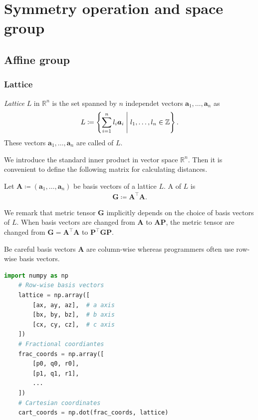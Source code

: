 \section{\label{sec:operation}Symmetry operation and space group}

\subsection{Affine group}

\subsubsection{Lattice}

\begin{screen}
  \begin{defn}[lattice]
    \textit{Lattice} $L$ in $\mathbb{R}^{n}$ is the set spanned by $n$ independet vectors $\bm{a}_{1}, \dots, \bm{a}_{n}$ as
    \begin{align}
      L \coloneqq \left\{  \sum_{i=1}^{n} l_{i} \bm{a}_{i}  \mathrel{}\middle|\mathrel{}  l_{1}, \dots, l_{n} \in \mathbb{Z}  \right\}.
    \end{align}
    These vectors $\bm{a}_{1}, \dots, \bm{a}_{n}$ are called  of $L$.
  \end{defn}
\end{screen}

We introduce the standard inner product in vector space $\mathbb{R}^{n}$.
Then it is convenient to define the following matrix for calculating distances.

\begin{screen}
  \begin{defn}
    Let $\mathbf{A} \coloneqq ( \mathbf{a}_{1}, \dots, \mathbf{a}_{n} )$ be basis vectors of a lattice $L$.
    A  of $L$ is
    \begin{align}
      \bm{G} \coloneqq \bm{A}^{\top} \bm{A}.
    \end{align}
  \end{defn}
\end{screen}

We remark that metric tensor $\bm{G}$ implicitly depends on the choice of basis vectors of $L$.
When basis vectors are changed from $\bm{A}$ to $\bm{AP}$, the metric tensor are changed from $ \bm{G} = \bm{A}^{\top} \bm{A}$ to $\bm{P}^{\top} \bm{GP}$.

Be careful basis vectors $\bm{A}$ are column-wise whereas programmers often use row-wise basis vectors.
\begin{lstlisting}[language=Python]
    import numpy as np
    # Row-wise basis vectors
    lattice = np.array([
        [ax, ay, az],  # a axis
        [bx, by, bz],  # b axis
        [cx, cy, cz],  # c axis
    ])
    # Fractional coordiantes
    frac_coords = np.array([
        [p0, q0, r0],
        [p1, q1, r1],
        ...
    ])
    # Cartesian coordinates
    cart_coords = np.dot(frac_coords, lattice)
\end{lstlisting}

